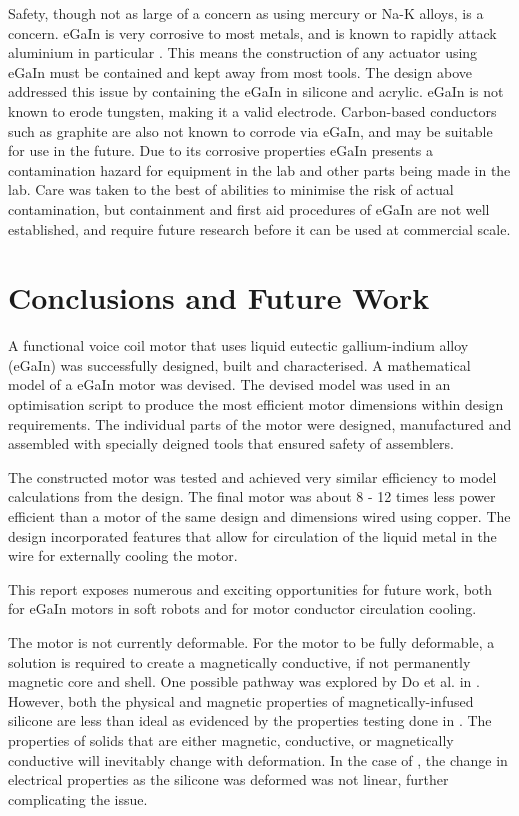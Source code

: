 \documentclass[a4paper,12pt]{article}
\begin{document}
Safety, though not as large of a concern as using mercury or Na-K alloys, is a concern. eGaIn is very corrosive to most metals, and is known to rapidly attack aluminium in particular \cite{cuiLiquidMetalCorrosion2018}. This means the construction of any actuator using eGaIn must be contained and kept away from most tools. The design above addressed this issue by containing the eGaIn in silicone and acrylic. eGaIn is not known to erode tungsten, making it a valid electrode. Carbon-based conductors such as graphite are also not known to corrode via eGaIn, and may be suitable for use in the future. Due to its corrosive properties eGaIn presents a contamination hazard for equipment in the lab and other parts being made in the lab. Care was taken to the best of abilities to minimise the risk of actual contamination, but containment and first aid procedures of eGaIn are not well established, and require future research before it can be used at commercial scale.

\newpage

\section{Conclusions and Future Work}
A functional voice coil motor that uses liquid eutectic gallium-indium alloy (eGaIn) was successfully designed, built and characterised. A mathematical model of a eGaIn motor was devised. The devised model was used in an optimisation script to produce the most efficient motor dimensions within design requirements. The individual parts of the motor were designed, manufactured and assembled with specially deigned tools that ensured safety of assemblers.

The constructed motor was tested and achieved very similar efficiency to model calculations from the design. The final motor was about 8 - 12 times less power efficient than a motor of the same design and dimensions wired using copper. The design incorporated features that allow for circulation of the liquid metal in the wire for externally cooling the motor.

This report exposes numerous and exciting opportunities for future work, both for eGaIn motors in soft robots and for motor conductor circulation cooling.

The motor is not currently deformable. For the motor to be fully deformable, a solution is required to create a magnetically conductive, if not permanently magnetic core and shell. One possible pathway was explored by Do et al. in \cite{doMiniatureSoftElectromagnetic2018}. However, both the physical and magnetic properties of magnetically-infused silicone are less than ideal as evidenced by the properties testing done in \cite{valentaMechanicalElectricalTesting2008}. The properties of solids that are either magnetic, conductive, or magnetically conductive will inevitably change with deformation. In the case of \cite{valentaMechanicalElectricalTesting2008}, the change in electrical properties as the silicone was deformed was not linear, further complicating the issue.
\end{document}
